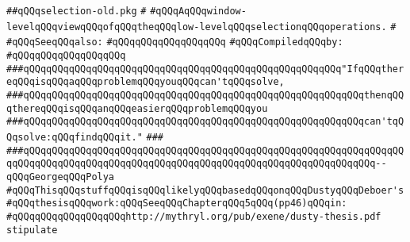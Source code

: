 \label{src/lib/x-kit/xclient/src/window/selection-old.pkg}
\verb|##qQQqselection-old.pkg|\newline
\verb|#|\newline
\verb|#qQQqAqQQqwindow-levelqQQqviewqQQqofqQQqtheqQQqlow-levelqQQqselectionqQQqoperations.|\newline
\verb|#|\newline
\verb|#qQQqSeeqQQqalso:|\newline
\verb|#qQQqqQQqqQQqqQQqqQQq|\newline
\newline
\verb|#qQQqCompiledqQQqby:|\newline
\verb|#qQQqqQQqqQQqqQQqqQQq|\newline
\newline
\newline
\newline
\newline
\newline
\newline
\verb|###qQQqqQQqqQQqqQQqqQQqqQQqqQQqqQQqqQQqqQQqqQQqqQQqqQQqqQQq"IfqQQqthereqQQqisqQQqaqQQqproblemqQQqyouqQQqcan'tqQQqsolve,|\newline
\verb|###qQQqqQQqqQQqqQQqqQQqqQQqqQQqqQQqqQQqqQQqqQQqqQQqqQQqqQQqqQQqthenqQQqthereqQQqisqQQqanqQQqeasierqQQqproblemqQQqyou|\newline
\verb|###qQQqqQQqqQQqqQQqqQQqqQQqqQQqqQQqqQQqqQQqqQQqqQQqqQQqqQQqqQQqcan'tqQQqsolve:qQQqfindqQQqit."|\newline
\verb|###|\newline
\verb|###qQQqqQQqqQQqqQQqqQQqqQQqqQQqqQQqqQQqqQQqqQQqqQQqqQQqqQQqqQQqqQQqqQQqqQQqqQQqqQQqqQQqqQQqqQQqqQQqqQQqqQQqqQQqqQQqqQQqqQQqqQQqqQQqqQQq--qQQqGeorgeqQQqPolya|\newline
\newline
\newline
\verb|#qQQqThisqQQqstuffqQQqisqQQqlikelyqQQqbasedqQQqonqQQqDustyqQQqDeboer's|\newline
\verb|#qQQqthesisqQQqwork:qQQqSeeqQQqChapterqQQq5qQQq(pp46)qQQqin:|\newline
\verb|#qQQqqQQqqQQqqQQqqQQqhttp://mythryl.org/pub/exene/dusty-thesis.pdf|\newline
\newline
\verb|stipulate|\newline
